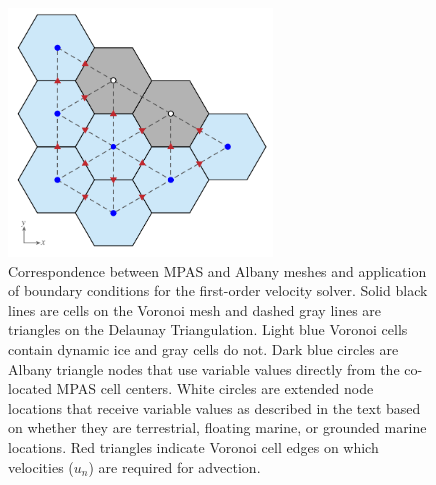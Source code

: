 

\begin{figure}[t]
\centering
\includegraphics[width=7.0cm]{landice/figures/mpas_grid_albany_bc.pdf}
\caption{Correspondence between MPAS and Albany meshes and application of boundary conditions for the first-order velocity solver.
Solid black lines are cells on the Voronoi mesh and dashed gray lines are triangles on the Delaunay Triangulation.
Light blue Voronoi cells contain dynamic ice and gray cells do not.  
Dark blue circles are Albany triangle nodes that use variable values directly from the co-located MPAS cell centers.
White circles are extended node locations that receive variable values as described in the text based on whether they are terrestrial, floating marine, or grounded marine locations.
Red triangles indicate Voronoi cell edges on which velocities ($u_n$) are required for advection.
}
\label{fig:mesh-bc}
\end{figure}


